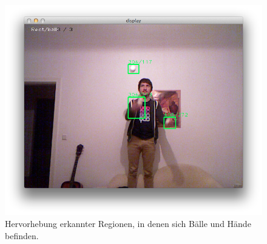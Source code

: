 \documentclass[12pt,a4paper,ngerman]{scrartcl}
\begin{document}
\begin{figure}[H]
    \centering
    \includegraphics[scale=0.5]{img/rects-1.png}
    \vspace{-0.5cm}
    \caption{Hervorhebung erkannter Regionen, in denen sich Bälle und Hände befinden.}
    \label{rects-1}
\end{figure}
\end{document}
